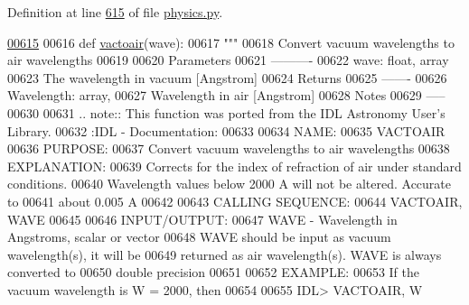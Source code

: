 Definition at line \hyperlink{physics_8py_source_l00615}{615} of file \hyperlink{physics_8py_source}{physics.\-py}.


\begin{DoxyCode}
\hypertarget{namespacepyneb_1_1utils_1_1physics_l00615}{}\hyperlink{namespacepyneb_1_1utils_1_1physics_ae7f2ba7fc89983bb4d9fa50eb37f4b36}{00615} 
00616 \textcolor{keyword}{def }\hyperlink{namespacepyneb_1_1utils_1_1physics_ae7f2ba7fc89983bb4d9fa50eb37f4b36}{vactoair}(wave):
00617     \textcolor{stringliteral}{"""}
00618 \textcolor{stringliteral}{Convert vacuum wavelengths to air wavelengths}
00619 \textcolor{stringliteral}{}
00620 \textcolor{stringliteral}{Parameters}
00621 \textcolor{stringliteral}{----------}
00622 \textcolor{stringliteral}{wave: float, array}
00623 \textcolor{stringliteral}{The wavelength in vacuum [Angstrom]}
00624 \textcolor{stringliteral}{Returns}
00625 \textcolor{stringliteral}{-------}
00626 \textcolor{stringliteral}{Wavelength: array,}
00627 \textcolor{stringliteral}{Wavelength in air [Angstrom]}
00628 \textcolor{stringliteral}{Notes}
00629 \textcolor{stringliteral}{-----}
00630 \textcolor{stringliteral}{}
00631 \textcolor{stringliteral}{.. note:: This function was ported from the IDL Astronomy User's Library.}
00632 \textcolor{stringliteral}{:IDL - Documentation:}
00633 \textcolor{stringliteral}{}
00634 \textcolor{stringliteral}{NAME:}
00635 \textcolor{stringliteral}{VACTOAIR}
00636 \textcolor{stringliteral}{PURPOSE:}
00637 \textcolor{stringliteral}{Convert vacuum wavelengths to air wavelengths}
00638 \textcolor{stringliteral}{EXPLANATION:}
00639 \textcolor{stringliteral}{Corrects for the index of refraction of air under standard conditions.}
00640 \textcolor{stringliteral}{Wavelength values below 2000 A will not be altered. Accurate to}
00641 \textcolor{stringliteral}{about 0.005 A}
00642 \textcolor{stringliteral}{}
00643 \textcolor{stringliteral}{CALLING SEQUENCE:}
00644 \textcolor{stringliteral}{VACTOAIR, WAVE}
00645 \textcolor{stringliteral}{}
00646 \textcolor{stringliteral}{INPUT/OUTPUT:}
00647 \textcolor{stringliteral}{WAVE - Wavelength in Angstroms, scalar or vector}
00648 \textcolor{stringliteral}{WAVE should be input as vacuum wavelength(s), it will be}
00649 \textcolor{stringliteral}{returned as air wavelength(s). WAVE is always converted to}
00650 \textcolor{stringliteral}{double precision}
00651 \textcolor{stringliteral}{}
00652 \textcolor{stringliteral}{EXAMPLE:}
00653 \textcolor{stringliteral}{If the vacuum wavelength is W = 2000, then}
00654 \textcolor{stringliteral}{}
00655 \textcolor{stringliteral}{IDL> VACTOAIR, W}

\end{DoxyCode}
